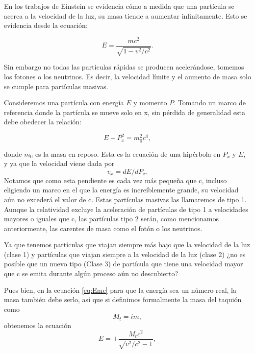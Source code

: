 \documentclass[twocolumn,preprintnumbers,amsmath,amssymb]{revtex4}
\begin{document}
En los trabajos de Einstein se evidencia cómo a medida que una partícula se acerca a la velocidad de la luz, su masa tiende a aumentar infinitamente. Esto se evidencia desde la ecuación:

\begin{equation}
E = \frac{mc^2}{\sqrt{1-v^2/c^2}}.
\label{eq:Emc}
\end{equation}

Sin embargo no todas las partículas rápidas se producen acelerándose, tomemos los fotones o los neutrinos.
Es decir, la velocidad límite y el aumento de masa solo se cumple para partículas masivas.

Consideremos una partícula con energía $E$ y momento $P$. Tomando un marco de referencia donde la partícula se mueve solo en x, sin pérdida de generalidad esta debe obedecer la relación:

\begin{equation}
E - P_{x}^2 = m_0^2 c^4,
\label{eq:EP}
\end{equation}

donde $m_0$ es la masa en reposo. Esta es la ecuación de una hipérbola en $P_x$ y $E$, y  ya que la velocidad viene dada por 
\begin{equation}
v_x = dE/dP_x.
\label{eq:Pendiente}
\end{equation}
Notamos que como esta pendiente es cada vez más pequeña que c, incluso eligiendo un marco en el que la energía es increíblemente grande, su velocidad aún no excederá el valor de c. Estas partículas masivas las llamaremos de tipo 1.  Aunque la relatividad excluye la aceleración de partículas de tipo 1 a velocidades mayores o iguales que c, las partículas tipo 2 serán, como mencionamos anteriormente, las carentes de masa como el fotón o los neutrinos.

Ya que tenemos partículas que viajan siempre más bajo que la velocidad de la luz (clase 1) y partículas que viajan siempre a la velocidad de la luz (clase 2) ¿no es posible que un nuevo tipo (Clase 3) de partícula que tiene una velocidad mayor que c se emita durante algún proceso aún no descubierto?
 
 Pues bien, en la ecuación \eqref{eq:Emc} para que la energía sea un número real, la masa también debe serlo, así que si definimos formalmente la masa del taquión como 
 \begin{equation}
 M_t = im ,
 \label{eq:Mt}
 \end{equation}
 obtenemos la ecuación 
 \begin{equation}
E = \pm \frac{M_t c^2}{\sqrt{v^2/c^2 - 1}} ,
\label{eq:Emtc}
\end{equation}
\end{document}
